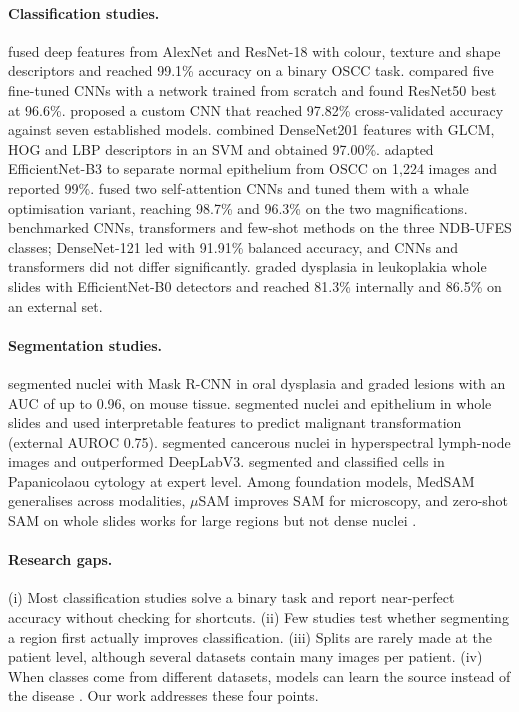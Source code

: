 \documentclass[10pt,twocolumn]{article}
\begin{document}
\paragraph{Classification studies.} \citet{fati2022} fused deep features from AlexNet and ResNet-18 with colour, texture and shape descriptors and reached 99.1\% accuracy on a binary OSCC task. \citet{panigrahi2023} compared five fine-tuned CNNs with a network trained from scratch and found ResNet50 best at 96.6\%. \citet{das2023} proposed a custom CNN that reached 97.82\% cross-validated accuracy against seven established models. \citet{ahmad2023} combined DenseNet201 features with GLCM, HOG and LBP descriptors in an SVM and obtained 97.00\%. \citet{albalawi2024} adapted EfficientNet-B3 to separate normal epithelium from OSCC on 1,224 images and reported 99\%. \citet{meer2025} fused two self-attention CNNs and tuned them with a whale optimisation variant, reaching 98.7\% and 96.3\% on the two magnifications. \citet{maia2024} benchmarked CNNs, transformers and few-shot methods on the three NDB-UFES classes; DenseNet-121 led with 91.91\% balanced accuracy, and CNNs and transformers did not differ significantly. \citet{peng2024} graded dysplasia in leukoplakia whole slides with EfficientNet-B0 detectors and reached 81.3\% internally and 86.5\% on an external set.

\paragraph{Segmentation studies.} \citet{silva2022} segmented nuclei with Mask R-CNN in oral dysplasia and graded lesions with an AUC of up to 0.96, on mouse tissue. \citet{shephard2024} segmented nuclei and epithelium in whole slides and used interpretable features to predict malignant transformation (external AUROC 0.75). \citet{zhang2024} segmented cancerous nuclei in hyperspectral lymph-node images and outperformed DeepLabV3. \citet{ronnau2024} segmented and classified cells in Papanicolaou cytology at expert level. Among foundation models, MedSAM \citep{ma2024} generalises across modalities, $\mu$SAM \citep{archit2025} improves SAM for microscopy, and zero-shot SAM on whole slides works for large regions but not dense nuclei \citep{deng2025}.

\paragraph{Research gaps.} (i) Most classification studies solve a binary task and report near-perfect accuracy without checking for shortcuts. (ii) Few studies test whether segmenting a region first actually improves classification. (iii) Splits are rarely made at the patient level, although several datasets contain many images per patient. (iv) When classes come from different datasets, models can learn the source instead of the disease \citep{dehkharghanian2023}. Our work addresses these four points.
\end{document}
